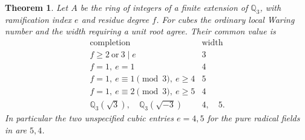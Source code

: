 \documentclass[11pt,letterpaper]{article}
\newtheorem{theorem}{Theorem}[section]
\theoremstyle{definition}
\numberwithin{equation}{section}
\begin{document}
\begin{theorem}\label{nf3:triadic-class}
Let $A$ be the ring of integers of a finite extension of $\mathbb Q_3$,
with ramification index $e$ and residue degree $f$. For cubes the
ordinary local Waring number and the width requiring a unit root agree.
Their common value is
\[
\begin{array}{c|c}
\text{completion}&\text{width}\\ \hline
 f\ge2\ \text{or}\ 3\mid e &3\\
 f=1,\ e=1 &4\\
 f=1,\ e\equiv1\pmod3,\ e\ge4 &5\\
 f=1,\ e\equiv2\pmod3,\ e\ge5 &4\\
 \mathbb Q_3(\sqrt{3}),\quad\mathbb Q_3(\sqrt{-3})&4,\quad5 .
\end{array}
\]
In particular the two unspecified cubic entries $e=4,5$ for the pure
radical fields in \cite[\S4, Table~2]{AnthonyRam} are $5,4$.
\end{theorem}
\end{document}
